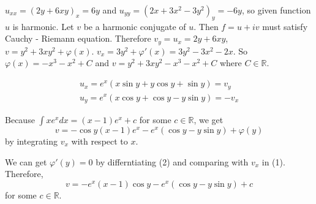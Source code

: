 \begin{problem}
	$u_{xx} = \left( 2y+6xy \right)_{x} = 6y$ and $u_{yy} = \left( 2x+3x^2 -3y^2 \right)_y = -6y$, so given function $u$ is harmonic. Let $v$ be a harmonic conjugate of $u$. Then $f = u+iv$ must satisfy Cauchy - Riemann equation. Therefore $v_y = u_x = 2y + 6xy$, $v = y^2 +3xy^2 + \varphi(x)$. $v_x = 3y^2 + \varphi'(x) = 3y^2 -3x^2 -2x$. So $\varphi(x) = -x^3 -x^2 + C$ and $v = y^2 +3xy^2 -x^3-x^2+C$ where $C \in \mathbb{R}$.
\end{problem}

\begin{problem}
	\begin{equation}
		\begin{split}
		u_x = e^x\left( x\sin y + y \cos y + \sin y \right) = v_y \\
		u_y = e^x\left( x \cos y + \cos y - y \sin y \right) = -v_x
	\end{split}
		\label{2CRequation}
	\end{equation}

	Because $\int x e^x dx = \left( x-1 \right)e^x + c$ for some $c \in \mathbb{R}$, we get
	\begin{equation}
		v = -\cos y \left( x-1 \right) e^x - e^x \left( \cos y - y \sin y \right) + \varphi(y)
		\label{2v}
	\end{equation}
	by integrating $v_x$ with respect to $x$.
	
	We can get $\varphi'(y) = 0$ by differntiating (2) and comparing with $v_x$ in (1).
	Therefore, 
	\begin{equation}
		v = -e^x(x-1)\cos y - e^x \left( \cos y - y \sin y \right) + c
		\label{2v}
	\end{equation}
	for some $c\in \mathbb{R}$.
\end{problem}

